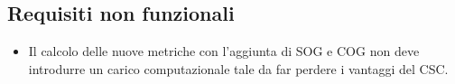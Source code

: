 \subsection{Requisiti non funzionali}
\label{sec:requisiti_non_funzionali}

\begin{itemize}
    \item Il calcolo delle nuove metriche con l'aggiunta di \ac{SOG} e \ac{COG} non deve introdurre un carico computazionale tale da far perdere i vantaggi del \ac{CSC}.
\end{itemize}
